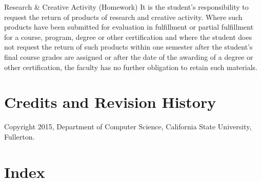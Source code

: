 \documentclass{book}
\begin{document}
Research & Creative Activity (Homework)
It is the student's responsibility to request the return of products of research and creative activity. Where such products have been submitted for evaluation in fulfillment or partial fulfillment for a course, program, degree or other certification and where the student does not request the return of such products within one semester after the student's final course grades are assigned or after the date of the awarding of a degree or other certification, the faculty has no further obligation to retain such materials.

\chapter{Credits and Revision History}

Copyright 2015, Department of Computer Science, California State University, Fullerton.

\chapter{Index}
\printindex
\end{document}
